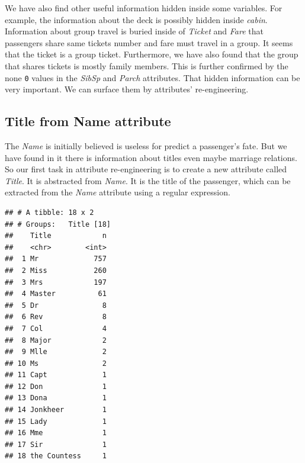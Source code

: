 \documentclass[
]{book}
\newenvironment{Shaded}{\begin{snugshade}}{\end{snugshade}}
\newcommand{\CharTok}[1]{\textcolor[rgb]{0.31,0.60,0.02}{#1}}
\newcommand{\CommentTok}[1]{\textcolor[rgb]{0.56,0.35,0.01}{\textit{#1}}}
\newcommand{\KeywordTok}[1]{\textcolor[rgb]{0.13,0.29,0.53}{\textbf{#1}}}
\newcommand{\NormalTok}[1]{#1}
\newcommand{\OperatorTok}[1]{\textcolor[rgb]{0.81,0.36,0.00}{\textbf{#1}}}
\newcommand{\StringTok}[1]{\textcolor[rgb]{0.31,0.60,0.02}{#1}}
\begin{document}
We have also find other useful information hidden inside some variables. For example, the information about the deck is possibly hidden inside \emph{cabin}. Information about group travel is buried inside of \emph{Ticket} and \emph{Fare} that passengers share same tickets number and fare must travel in a group. It seems that the ticket is a group ticket. Furthermore, we have also found that the group that shares tickets is mostly family members. This is further confirmed by the none \texttt{0} values in the \emph{SibSp} and \emph{Parch} attributes. That hidden information can be very important. We can surface them by attributes' re-engineering.

\hypertarget{title-from-name-attribute}{%
\subsection*{Title from Name attribute}\label{title-from-name-attribute}}


The \emph{Name} is initially believed is useless for predict a passenger's fate. But we have found in it there is information about titles even maybe marriage relations. So our first task in attribute re-engineering is to create a new attribute called \emph{Title}. It is abstracted from \emph{Name}. It is the title of the passenger, which can be extracted from the \emph{Name} attribute using a regular expression.

\begin{Shaded}
\end{Shaded}

\begin{verbatim}
## # A tibble: 18 x 2
## # Groups:   Title [18]
##    Title            n
##    <chr>        <int>
##  1 Mr             757
##  2 Miss           260
##  3 Mrs            197
##  4 Master          61
##  5 Dr               8
##  6 Rev              8
##  7 Col              4
##  8 Major            2
##  9 Mlle             2
## 10 Ms               2
## 11 Capt             1
## 12 Don              1
## 13 Dona             1
## 14 Jonkheer         1
## 15 Lady             1
## 16 Mme              1
## 17 Sir              1
## 18 the Countess     1
\end{verbatim}
\end{document}
